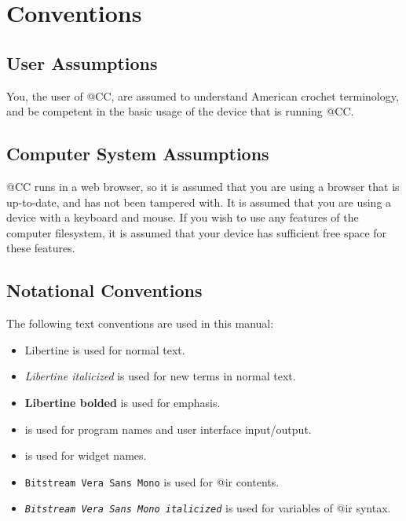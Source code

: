 \documentclass[main.tex]{subfiles}
\begin{document}
\chapter{Conventions}\label{chp:conventions}

\section{User Assumptions}

You, the user of @CC, are assumed to understand American crochet terminology, and be competent in the basic usage of the device that is running @CC.

\section{Computer System Assumptions}\label{sec:csassumptions}

@CC runs in a web browser, so it is assumed that you are using a browser that is up-to-date, and has not been tampered with.
It is assumed that you are using a device with a keyboard and mouse.
If you wish to use any features of the computer filesystem, it is assumed that your device has sufficient free space for these features.

\section{Notational Conventions}

The following text conventions are used in this manual:

\begin{itemize}
\item Libertine is used for normal text.
\item \emph{Libertine italicized} is used for new terms in normal text.
\item \textbf{Libertine bolded} is used for emphasis.
\item {} is used for program names and user interface input/output.
\item {} is used for widget names.
\item \Verb`Bitstream Vera Sans Mono` is used for @ir contents.
\item \emph{\Verb`Bitstream Vera Sans Mono italicized`} is used for variables of @ir syntax.
\end{itemize}
\end{document}
